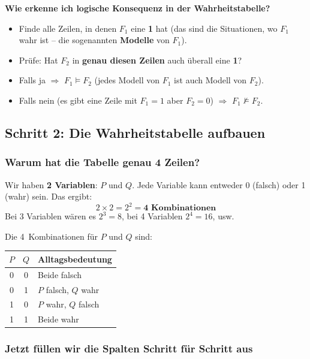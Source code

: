 \documentclass[a4paper,12pt]{article}
\begin{document}
\textbf{Wie erkenne ich logische Konsequenz in der Wahrheitstabelle?}
\begin{itemize}
\item Finde alle Zeilen, in denen $F_1$ eine \textbf{1} hat (das sind die Situationen, wo $F_1$ wahr ist -- die sogenannten \textbf{Modelle} von $F_1$).
\item Pr\"ufe: Hat $F_2$ in \textbf{genau diesen Zeilen} auch \"uberall eine \textbf{1}?
\item Falls ja $\Rightarrow$ $F_1 \models F_2$ (jedes Modell von $F_1$ ist auch Modell von $F_2$).
\item Falls nein (es gibt eine Zeile mit $F_1 = 1$ aber $F_2 = 0$) $\Rightarrow$ $F_1 \not\models F_2$.
\end{itemize}

\subsection{Schritt 2: Die Wahrheitstabelle aufbauen}

\subsubsection*{Warum hat die Tabelle genau 4 Zeilen?}

\begin{merkbox}
Wir haben \textbf{2 Variablen}: $P$ und $Q$. Jede Variable kann entweder 0 (falsch) oder 1 (wahr) sein. Das ergibt:
\[
2 \times 2 = 2^2 = \textbf{4 Kombinationen}
\]
Bei 3 Variablen w\"aren es $2^3 = 8$, bei 4 Variablen $2^4 = 16$, usw.
\end{merkbox}

Die 4~Kombinationen f\"ur $P$ und $Q$ sind:
\begin{center}
\begin{tabular}{cc|l}
$P$ & $Q$ & Alltagsbedeutung \\
\midrule
0 & 0 & Beide falsch \\
0 & 1 & $P$ falsch, $Q$ wahr \\
1 & 0 & $P$ wahr, $Q$ falsch \\
1 & 1 & Beide wahr \\
\end{tabular}
\end{center}

\subsubsection*{Jetzt f\"ullen wir die Spalten Schritt f\"ur Schritt aus}
\end{document}
